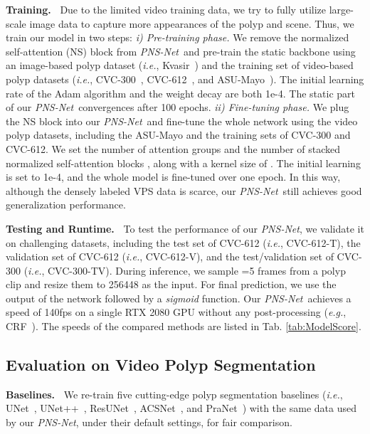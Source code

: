 \documentclass[runningheads]{llncs}
\newcommand{\tabref}[1]{Tab. \ref{#1}}
\def\ie{\emph{i.e.}}
\def\eg{\emph{e.g.}}
\def\ourmodel{\textit{PNS-Net}}
\newcommand{\myPara}[1]{\noindent\textbf{#1~}}
\begin{document}
\myPara{Training.} 
Due to the limited video training data, we try to fully utilize large-scale image data to capture more appearances of the polyp and scene. Thus, we train our model in two steps:
\textit{i) Pre-training phase.} We remove the normalized self-attention (NS) block from \ourmodel~and pre-train the static backbone using an image-based polyp dataset (\ie, Kvasir~\cite{jha2020kvasir}) and the training set of video-based polyp datasets (\ie,  CVC-300~\cite{bernal2012towards}, CVC-612~\cite{bernal2015wm}, and ASU-Mayo~\cite{tajbakhsh2015automated}).
The initial learning rate of the Adam algorithm and the weight decay are both 1e{-4}.
The static part of our \ourmodel~convergences after 100 epochs.
\textit{ii) Fine-tuning phase.} We plug the NS block into 
our \ourmodel~and fine-tune the whole network 
using the video polyp datasets, including the ASU-Mayo and the training sets of CVC-300 and CVC-612.
We set the number of attention groups  and the number of stacked normalized self-attention blocks , along with a kernel size of .
The initial learning is set to 1e{-4}, and the whole model is fine-tuned over one epoch.
In this way, although the densely labeled VPS data is scarce, our \ourmodel~still achieves good generalization performance.


\myPara{Testing and Runtime.}
To test the performance of our \ourmodel,
we validate it on challenging datasets, including the test set of CVC-612 (\ie, CVC-612-T), the validation set of CVC-612 (\ie,  CVC-612-V), and the test/validation set of CVC-300 (\ie, CVC-300-TV).
During inference, we sample =5 frames from a polyp clip and resize them to 256448 as the input.
For final prediction, we use the output  of the network followed by a \textit{sigmoid} function.
Our \ourmodel~achieves a speed of 140fps on a single RTX 2080 GPU without any post-processing (\eg, CRF~\cite{krahenbuhl2011efficient}).
The speeds of the compared methods are listed in \tabref{tab:ModelScore}. 



\subsection{Evaluation on Video Polyp Segmentation}

\myPara{Baselines.} 
We re-train five cutting-edge polyp segmentation baselines (\ie, UNet~\cite{ronneberger2015u}, UNet++~\cite{zhou2018unetplus}, ResUNet~\cite{jha2019resunetplus}, ACSNet~\cite{zhang2020adaptive}, and PraNet~\cite{fan2020pra}) with the same data used by our \ourmodel, under their default settings, for fair comparison.
\end{document}
